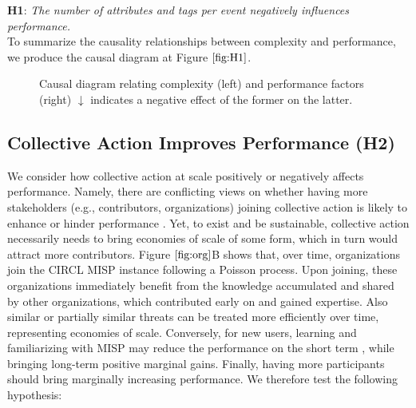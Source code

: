 \documentclass[unnumsec,webpdf,contemporary,large]{oup-authoring-template}%
\theoremstyle{thmstyleone}%
\theoremstyle{thmstyletwo}%
\theoremstyle{thmstylethree}%
\begin{document}
\textbf{H1}: \textit{The number of attributes and tags per event negatively influences performance.}\\
\noindent
To summarize the causality relationships between complexity and performance, we produce the causal diagram at Figure $\ref{fig:H1}$.

\begin{figure}[!ht]
\begin{center}
\caption{Causal diagram relating complexity (left) and performance factors (right) $\downarrow$ indicates a negative effect of the former on the latter.}
\label{fig:H1}
\end{center}
\end{figure}

\subsection{Collective Action Improves Performance (H2)}
 
We consider how collective action at scale positively or negatively affects performance. Namely, there are conflicting views on whether having more stakeholders (e.g., contributors, organizations) joining collective action is likely to enhance or hinder performance \cite{olson_logic_1971, sornette2014much,scholtes_aristotle_2016, maillart_aristotle_2019,muric_collaboration_2019}. Yet, to exist and be sustainable, collective action necessarily needs to bring economies of scale of some form, which in turn would attract more contributors. Figure $\ref{fig:org}$B shows that, over time, organizations join the CIRCL MISP instance following a Poisson process. Upon joining, these organizations immediately benefit from the knowledge accumulated and shared by other organizations, which contributed early on and gained expertise. Also similar or partially similar threats can be treated more efficiently over time, representing economies of scale. Conversely, for new users, learning and familiarizing  with MISP may reduce the performance on the short term {\cite{stojkovski_whats_2021}}, while bringing long-term positive marginal gains. Finally, having more participants should bring marginally increasing performance. We therefore test the following hypothesis:\\
\end{document}
